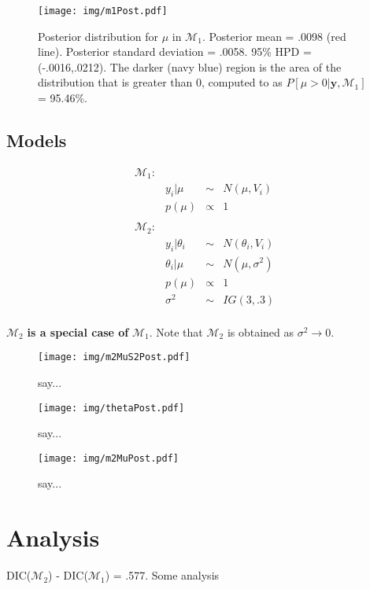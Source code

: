 \documentclass{../../tex_template/asaproc}
\newcommand{\bk}[1]{\left[#1\right]}
\newcommand{\M}{\mathcal{M}}
\begin{document}
\begin{figure}[H]
  \texttt{[image: img/m1Post.pdf]}
  \caption{\small Posterior distribution for $\mu$ in $\M_1$.  Posterior mean =
  .0098 (red line). Posterior standard deviation = .0058.  95\% HPD =
  (-.0016,.0212). The darker (navy blue) region is the area of the  distribution
  that is greater than 0, computed to as $P\bk{\mu>0|\bm{y},\M_1}$ = 95.46\%.}
  \label{fig:m1Post}
\end{figure}


\subsection{Models}

$$
\begin{array}{lrcl}
  \M_1: \\
  & y_i | \mu &\sim& N(\mu,V_i)\\
  & p(\mu) &\propto& 1\\
  \\
  \M_2: \\
  & y_i | \theta_i &\sim& N(\theta_i,V_i)\\
  & \theta_i | \mu &\sim& N(\mu,\sigma^2)\\
  & p(\mu) &\propto& 1\\
  & \sigma^2 &\sim& IG(3,.3)\\
\end{array}
$$

$\M_2$ \textbf{is a special case of} $\M_1$. Note that $\M_2$ is
obtained as $\sigma^2 \rightarrow 0$.

\begin{figure}[H]
  \texttt{[image: img/m2MuS2Post.pdf]}
  \caption{say...}
  \label{fig:m2MuS2Post}
\end{figure}

\begin{figure}[H]
  \texttt{[image: img/thetaPost.pdf]}
  \caption{say...}
  \label{fig:thetaPost}
\end{figure}

\begin{figure}[H]
  \texttt{[image: img/m2MuPost.pdf]}
  \caption{say...}
  \label{fig:m2MuPost}
\end{figure}

\section{Analysis}
DIC($\M_2$) - DIC($\M_1$) = .577.
Some analysis
\end{document}
